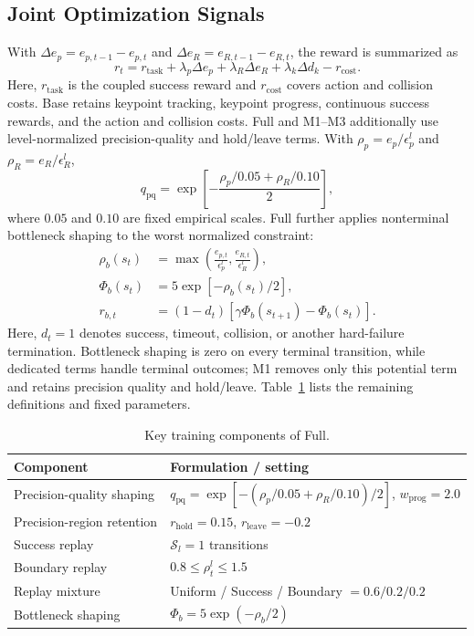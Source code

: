 \documentclass[conference]{IEEEtran}
\begin{document}
\subsection{Joint Optimization Signals}
With $\Delta e_p=e_{p,t-1}-e_{p,t}$ and $\Delta e_R=e_{R,t-1}-e_{R,t}$, the reward is summarized as
\begin{equation}
r_t=r_{\mathrm{task}}+\lambda_p\Delta e_p+\lambda_R\Delta e_R
 +\lambda_k\Delta d_k-r_{\mathrm{cost}} .
\label{eq:reward}
\end{equation}
Here, $r_{\mathrm{task}}$ is the coupled success reward and $r_{\mathrm{cost}}$ covers action and collision costs. Base retains keypoint tracking, keypoint progress, continuous success rewards, and the action and collision costs. Full and M1--M3 additionally use level-normalized precision-quality and hold/leave terms. With $\rho_p=e_p/\epsilon_p^l$ and $\rho_R=e_R/\epsilon_R^l$,
\begin{equation}
q_{\mathrm{pq}}=\exp\left[-\frac{\rho_p/0.05+\rho_R/0.10}{2}\right],
\end{equation}
where $0.05$ and $0.10$ are fixed empirical scales. Full further applies nonterminal bottleneck shaping to the worst normalized constraint:
\begin{align}
\rho_b(s_t)&=\max\left(\frac{e_{p,t}}{\epsilon_p^l},\frac{e_{R,t}}{\epsilon_R^l}\right),\\
\Phi_b(s_t)&=5\exp[-\rho_b(s_t)/2],\\
r_{b,t}&=(1-d_t)[\gamma\Phi_b(s_{t+1})-\Phi_b(s_t)].
\label{eq:bottleneck}
\end{align}
Here, $d_t=1$ denotes success, timeout, collision, or another hard-failure termination. Bottleneck shaping is zero on every terminal transition, while dedicated terms handle terminal outcomes; M1 removes only this potential term and retains precision quality and hold/leave. Table~\ref{tab:fullcomponents} lists the remaining definitions and fixed parameters.

\begin{table}[htbp]
\caption{Key training components of Full.}
\label{tab:fullcomponents}
\centering
\begin{tabular}{p{}|p{}}
\hline
Component & Formulation / setting\\
\hline
Precision-quality shaping & $q_{\mathrm{pq}}=\exp[-(\rho_p/0.05+\rho_R/0.10)/2]$, $w_{\mathrm{prog}}=2.0$\\
Precision-region retention & $r_{\mathrm{hold}}=0.15$, $r_{\mathrm{leave}}=-0.2$\\
Success replay & $\mathcal{S}_l=1$ transitions\\
Boundary replay & $0.8\leq\rho_t^l\leq1.5$\\
Replay mixture & Uniform / Success / Boundary $=0.6/0.2/0.2$\\
Bottleneck shaping & $\Phi_b=5\exp(-\rho_b/2)$\\
\hline
\end{tabular}
\end{table}
\end{document}
